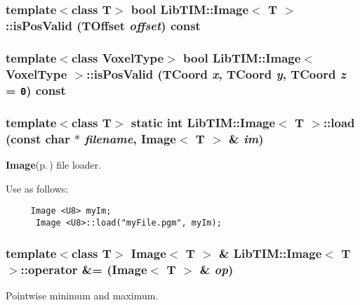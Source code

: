 \subsubsection{\setlength{\rightskip}{0pt plus 5cm}template$<$class T$>$ bool {\bf Lib\-TIM::Image}$<$ T $>$::is\-Pos\-Valid ({\bf TOffset} {\em offset}) const\hspace{0.3cm}{\tt  [inline, inherited]}}\label{group__Image_ga69}


\subsubsection{\setlength{\rightskip}{0pt plus 5cm}template$<$class Voxel\-Type$>$ bool {\bf Lib\-TIM::Image}$<$ Voxel\-Type $>$::is\-Pos\-Valid ({\bf TCoord} {\em x}, {\bf TCoord} {\em y}, {\bf TCoord} {\em z} = {\tt 0}) const\hspace{0.3cm}{\tt  [inherited]}}\label{group__Image_ga68}


\subsubsection{\setlength{\rightskip}{0pt plus 5cm}template$<$class T$>$ static int {\bf Lib\-TIM::Image}$<$ T $>$::load (const char $\ast$ {\em filename}, {\bf Image}$<$ T $>$ \& {\em im})\hspace{0.3cm}{\tt  [static, inherited]}}\label{group__Image_ga9}


{\bf Image}{\rm (p.\,\pageref{classLibTIM_1_1Image})} file loader. 

Use as follows: 

\footnotesize\begin{verbatim}	  Image <U8> myIm;
	  Image <U8>::load("myFile.pgm", myIm);
	  \end{verbatim}
\normalsize
{}
\subsubsection{\setlength{\rightskip}{0pt plus 5cm}template$<$class T$>$ Image$<$ T $>$ \& {\bf Lib\-TIM::Image}$<$ T $>$::operator \&= ({\bf Image}$<$ T $>$ \& {\em op})\hspace{0.3cm}{\tt  [inherited]}}\label{group__Image_ga51}


Pointwise minimum and maximum. 

